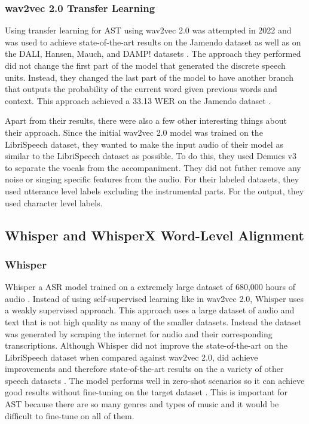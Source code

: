 \documentclass[letterpaper, 12pt]{article}
\begin{document}
\begin{multicols*}{2}
\subsubsection{wav2vec 2.0 Transfer Learning}
Using transfer learning for AST using wav2vec 2.0 was attempted in 2022 and was used to achieve
state-of-the-art results on the Jamendo dataset as well as on the DALI, Hansen, Mauch,
and DAMP! datasets \citep{wav2vecTransfer}. The approach they performed did not change the first part
of the model that generated the discrete speech units. Instead, they changed the last part of the
model to have another branch that outputs the probability of the current word given previous words
and context. This approach achieved a 33.13 WER on the Jamendo dataset \citep{wav2vecTransfer}.

Apart from their results, there were also a few other interesting things about their approach. Since
the initial wav2vec 2.0 model was trained on the LibriSpeech dataset, they wanted to make the input
audio of their model as similar to the LibriSpeech dataset as possible. To do this, they used
Demucs v3 \citep{Demucs} to separate the vocals from the accompaniment. They did not futher remove any
noise or singing specific features from the audio. For their labeled datasets, they used
utterance level labels excluding the instrumental parts. For the output, they used character level
labels.

\subsection{Whisper and WhisperX Word-Level Alignment}

\subsubsection{Whisper}
Whisper a ASR model trained on a extremely large dataset of 680,000 hours of audio \citep{whisper}.
Instead of using self-supervised learning like in wav2vec 2.0, Whisper uses a weakly supervised
approach. This approach uses a large dataset of audio and text that is not high quality as many of
the smaller datasets. Instead the dataset was generated by scraping the internet for audio and
their corresponding transcriptions. Although Whisper did not improve the state-of-the-art on the
LibriSpeech dataset when compared against wav2vec 2.0, did achieve improvements and therefore
state-of-the-art results on the a variety of other speech datasets \citep{whisper}. The model
performs well in zero-shot scenarios so it can achieve good results without fine-tuning on the
target dataset \citep{whisper}. This is important for AST because there are so many genres and
types of music and it would be difficult to fine-tune on all of them.


\end{multicols*}
\end{document}
